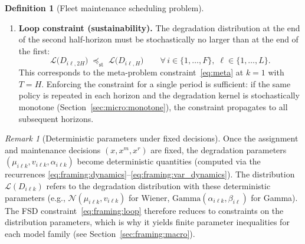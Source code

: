\documentclass[11pt,a4paper]{article}
\theoremstyle{plain}
\theoremstyle{definition}
\newtheorem{definition}[theorem]{Definition}
\theoremstyle{remark}
\newtheorem{remark}[theorem]{Remark}
\begin{document}
\begin{definition}[Fleet maintenance scheduling problem]
\begin{enumerate}[nosep,leftmargin=2em]
  \item \textbf{Loop constraint (sustainability).} The degradation distribution
    at the end of the second half-horizon must be stochastically no larger than
    at the end of the first:
    \begin{equation}\label{eq:framing:loop}
      \boxed{
        \mathcal{L}\bigl(D_{i\ell,2H}\bigr) \;\preceq_{\mathrm{st}}\;
        \mathcal{L}\bigl(D_{i\ell,H}\bigr)
        \qquad \forall\, i \in \{1,\ldots,F\},\; \ell \in \{1,\ldots,L\}.
      }
    \end{equation}
    This corresponds to the meta-problem constraint~\eqref{eq:meta} at $k=1$ with $T=H$.
    Enforcing the constraint for a single period is sufficient: if the same policy
    is repeated in each horizon and the degradation kernel is stochastically monotone
    (Section~\ref{sec:micro:monotone}), the constraint propagates to all subsequent horizons.
\end{enumerate}
\end{definition}

\begin{remark}[Deterministic parameters under fixed decisions]\label{rem:determ_params}
Once the assignment and maintenance decisions $(x, x^m, x^r)$ are fixed, the
degradation parameters $(\mu_{i\ell k}, v_{i\ell k}, \alpha_{i\ell k})$ become
deterministic quantities (computed via the recurrences
\eqref{eq:framing:dynamics}--\eqref{eq:framing:var_dynamics}).
The distribution $\mathcal{L}(D_{i\ell k})$ refers to the degradation distribution
with these deterministic parameters (e.g., $\mathcal{N}(\mu_{i\ell k}, v_{i\ell k})$
for Wiener, $\mathrm{Gamma}(\alpha_{i\ell k}, \beta_{i\ell})$ for Gamma).
The FSD constraint~\eqref{eq:framing:loop} therefore reduces to constraints on
the distribution parameters, which is why it yields finite parameter inequalities
for each model family (see Section~\ref{sec:framing:macro}).
\end{remark}
\end{document}
